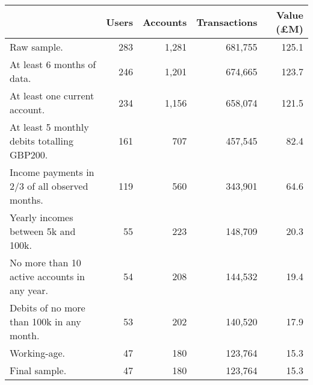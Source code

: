 \begin{tabular}{lrrrr}
\toprule
                                               & Users & Accounts & Transactions & Value (\pounds M) \\
\midrule
                                   Raw sample. &   283 &    1,281 &      681,755 &             125.1 \\
                    At least 6 months of data. &   246 &    1,201 &      674,665 &             123.7 \\
                 At least one current account. &   234 &    1,156 &      658,074 &             121.5 \\
   At least 5 monthly debits totalling GBP200. &   161 &      707 &      457,545 &              82.4 \\
Income payments in 2/3 of all observed months. &   119 &      560 &      343,901 &              64.6 \\
           Yearly incomes between 5k and 100k. &    55 &      223 &      148,709 &              20.3 \\
  No more than 10 active accounts in any year. &    54 &      208 &      144,532 &              19.4 \\
     Debits of no more than 100k in any month. &    53 &      202 &      140,520 &              17.9 \\
                                  Working-age. &    47 &      180 &      123,764 &              15.3 \\
                                 Final sample. &    47 &      180 &      123,764 &              15.3 \\
\bottomrule
\end{tabular}
